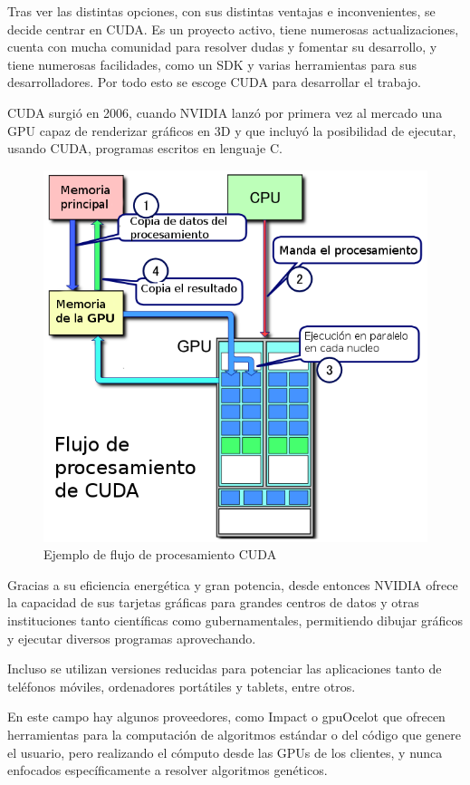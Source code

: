 Tras ver las distintas opciones, con sus distintas ventajas e inconvenientes, se decide centrar en CUDA. Es un proyecto activo, tiene numerosas actualizaciones, cuenta con mucha comunidad para resolver dudas y fomentar su desarrollo, y tiene numerosas facilidades, como un SDK \cite{nvidiadeveloper} y varias herramientas para sus desarrolladores. Por todo esto se escoge CUDA para desarrollar el trabajo.

\bigskip
CUDA surgió en 2006, cuando NVIDIA lanzó por primera vez al mercado una GPU capaz de renderizar gráficos en 3D y que incluyó la posibilidad de ejecutar, usando CUDA, programas escritos en lenguaje C.

\bigskip
\begin{figure}[h]
	\centering
	\includegraphics[width=0.6\linewidth]{../images/flujocuda}
	\caption[Ejemplo de flujo de procesamiento  CUDA]{Ejemplo de flujo de procesamiento CUDA}
	\label{fig:flujocuda}
\end{figure}


Gracias a su eficiencia energética y gran potencia, desde entonces NVIDIA ofrece la capacidad de sus tarjetas gráficas para grandes centros de datos y otras instituciones tanto científicas como gubernamentales, permitiendo dibujar gráficos y ejecutar diversos programas aprovechando.

Incluso se utilizan versiones reducidas para potenciar las aplicaciones tanto de teléfonos móviles, ordenadores portátiles y tablets, entre
otros.


\bigskip
En este campo hay algunos proveedores, como Impact  \cite{cudaimpact} o gpuOcelot \cite{cudagpuocelot} que ofrecen herramientas para la computación de algoritmos estándar o del código que genere el usuario, pero  realizando el cómputo desde las GPUs de los clientes, y nunca enfocados específicamente a resolver algoritmos genéticos.

